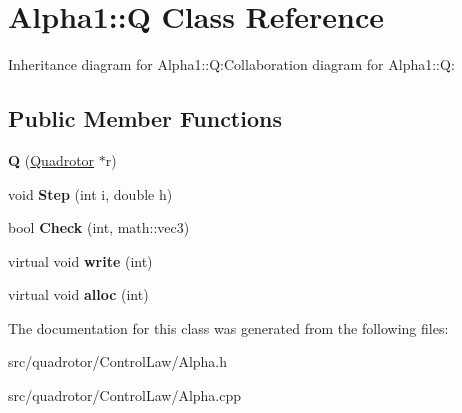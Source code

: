 \hypertarget{classAlpha1_1_1Q}{
\section{Alpha1::Q Class Reference}
\label{classAlpha1_1_1Q}
}
Inheritance diagram for Alpha1::Q:Collaboration diagram for Alpha1::Q:\subsection*{Public Member Functions}
\begin{DoxyCompactItemize}
\item 
\hypertarget{classAlpha1_1_1Q_a5c0a4a0d93f91068ba3157fd23b5e9ee}{
{\bfseries Q} (\hyperlink{classQuadrotor}{Quadrotor} $\ast$r)}
\label{classAlpha1_1_1Q_a5c0a4a0d93f91068ba3157fd23b5e9ee}

\item 
\hypertarget{classAlpha1_1_1Q_ac3f815ffaeb081809f36870cc27c39c1}{
void {\bfseries Step} (int i, double h)}
\label{classAlpha1_1_1Q_ac3f815ffaeb081809f36870cc27c39c1}

\item 
\hypertarget{classAlpha1_1_1Q_a5aeb733bd457272c4aadcb954461b071}{
bool {\bfseries Check} (int, math::vec3)}
\label{classAlpha1_1_1Q_a5aeb733bd457272c4aadcb954461b071}

\item 
\hypertarget{classAlpha1_1_1Q_a2d5895d825723a46858f38bbfb3fa1a0}{
virtual void {\bfseries write} (int)}
\label{classAlpha1_1_1Q_a2d5895d825723a46858f38bbfb3fa1a0}

\item 
\hypertarget{classAlpha1_1_1Q_a41dfc4912bed18a371c98b3046441e59}{
virtual void {\bfseries alloc} (int)}
\label{classAlpha1_1_1Q_a41dfc4912bed18a371c98b3046441e59}

\end{DoxyCompactItemize}


The documentation for this class was generated from the following files:\begin{DoxyCompactItemize}
\item 
src/quadrotor/ControlLaw/Alpha.h\item 
src/quadrotor/ControlLaw/Alpha.cpp\end{DoxyCompactItemize}
